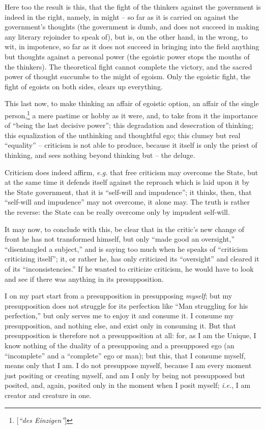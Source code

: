 Here too the result is this, that the fight of the thinkers against the 
government is indeed in the right, namely, in might -- so far as it is carried 
on against the government's thoughts (the government is dumb, and does not 
succeed in making any literary rejoinder to speak of), but is, on the other 
hand, in the wrong, to wit, in impotence, so far as it does not succeed in 
bringing into the field anything but thoughts against a personal power (the 
egoistic power stops the mouths of the thinkers). The theoretical fight cannot 
complete the victory, and the sacred power of thought succumbs to the might of 
egoism. Only the egoistic fight, the fight of egoists on both sides, clears up 
everything.

This last now, to make thinking an affair of egoistic option, an affair of the 
single person,\footnote{[\textit{``des Einzigen''}]} a mere pastime or hobby 
as it were, and, to take from it the importance of ``being the last decisive 
power''; this degradation and desecration of thinking; this equalization of 
the unthinking and thoughtful ego; this clumsy but real ``equality'' -- 
criticism is not able to produce, because it itself is only the priest of 
thinking, and sees nothing beyond thinking but -- the deluge.

Criticism does indeed affirm, \textit{e.g.} that free criticism may overcome 
the State, but at the same time it defends itself against the reproach which 
is laid upon it by the State government, that it is ``self-will and 
impudence''; it thinks, then, that ``self-will and impudence'' may not 
overcome, it alone may. The truth is rather the reverse: the State can be 
really overcome only by impudent self-will.

It may now, to conclude with this, be clear that in the critic's new change of 
front he has not transformed himself, but only ``made good an oversight,'' 
``disentangled a subject,'' and is saying too much when he speaks of 
``criticism criticizing itself''; it, or rather he, has only criticized its 
``oversight'' and cleared it of its ``inconsistencies.'' If he wanted to 
criticize criticism, he would have to look and see if there was anything in 
its presupposition.

I on my part start from a presupposition in presupposing \textit{myself}; but 
my presupposition does not struggle for its perfection like ``Man struggling 
for his perfection,'' but only serves me to enjoy it and consume it. I 
consume my presupposition, and nothing else, and exist only in consuming it. 
But that presupposition is therefore not a presupposition at all: for, as I am 
the Unique, I know nothing of the duality of a presupposing and a presupposed 
ego (an ``incomplete'' and a ``complete'' ego or man); but this, that I 
consume myself, means only that I am. I do not presuppose myself, because I am 
every moment just positing or creating myself, and am I only by being not 
presupposed but posited, and, again, posited only in the moment when I posit 
myself; \textit{i.e.}, I am creator and creature in one.


